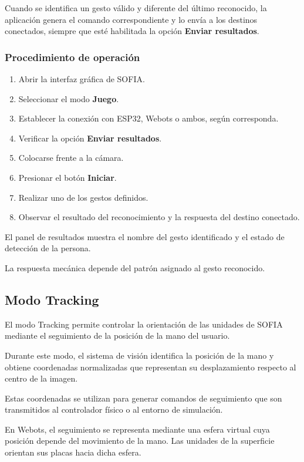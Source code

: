 \documentclass[letterpaper,journal]{IEEEtran}
\begin{document}
Cuando se identifica un gesto válido y diferente
del último reconocido, la aplicación genera el
comando correspondiente y lo envía a los destinos
conectados, siempre que esté habilitada la opción
\textbf{Enviar resultados}.

\subsubsection{Procedimiento de operación}

\begin{enumerate}
    \item Abrir la interfaz gráfica de SOFIA.
    \item Seleccionar el modo \textbf{Juego}.
    \item Establecer la conexión con ESP32,
    Webots o ambos, según corresponda.
    \item Verificar la opción
    \textbf{Enviar resultados}.
    \item Colocarse frente a la cámara.
    \item Presionar el botón \textbf{Iniciar}.
    \item Realizar uno de los gestos definidos.
    \item Observar el resultado del reconocimiento
    y la respuesta del destino conectado.
\end{enumerate}

El panel de resultados muestra el nombre del
gesto identificado y el estado de detección
de la persona.

La respuesta mecánica depende del patrón
asignado al gesto reconocido.

\subsection{Modo Tracking}

El modo Tracking permite controlar la orientación
de las unidades de SOFIA mediante el seguimiento
de la posición de la mano del usuario.

Durante este modo, el sistema de visión identifica
la posición de la mano y obtiene coordenadas
normalizadas que representan su desplazamiento
respecto al centro de la imagen.

Estas coordenadas se utilizan para generar comandos
de seguimiento que son transmitidos al controlador
físico o al entorno de simulación.

En Webots, el seguimiento se representa mediante
una esfera virtual cuya posición depende del
movimiento de la mano. Las unidades de la
superficie orientan sus placas hacia dicha esfera.
\end{document}

